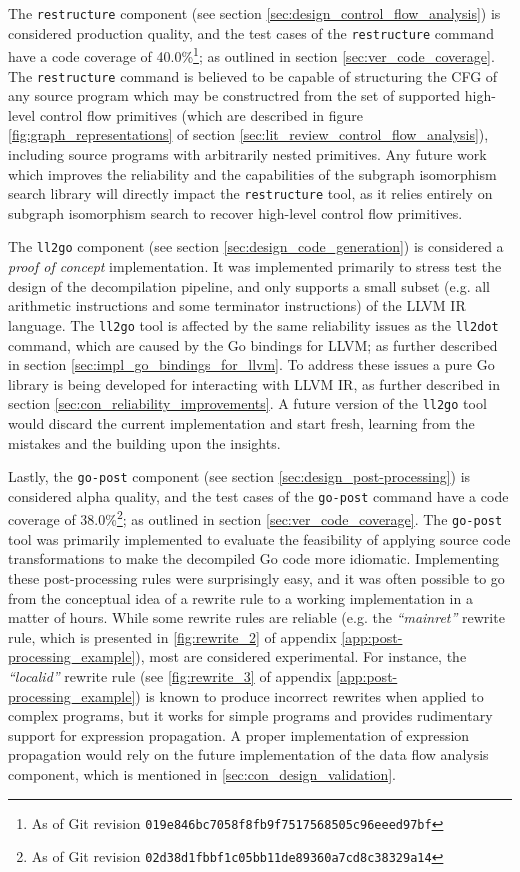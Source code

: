 The \texttt{restructure} component (see section \ref{sec:design_control_flow_analysis}) is considered production quality, and the test cases of the \texttt{restructure} command have a code coverage of 40.0\%\footnote{As of Git revision \texttt{019e846bc7058f8fb9f7517568505c96eeed97bf}}; as outlined in section \ref{sec:ver_code_coverage}. The \texttt{restructure} command is believed to be capable of structuring the CFG of any source program which may be constructred from the set of supported high-level control flow primitives (which are described in figure \ref{fig:graph_representations} of section \ref{sec:lit_review_control_flow_analysis}), including source programs with arbitrarily nested primitives. Any future work which improves the reliability and the capabilities of the subgraph isomorphism search library will directly impact the \texttt{restructure} tool, as it relies entirely on subgraph isomorphism search to recover high-level control flow primitives.

The \texttt{ll2go} component (see section \ref{sec:design_code_generation}) is considered a \textit{proof of concept} implementation. It was implemented primarily to stress test the design of the decompilation pipeline, and only supports a small subset (e.g. all arithmetic instructions and some terminator instructions) of the LLVM IR language. The \texttt{ll2go} tool is affected by the same reliability issues as the \texttt{ll2dot} command, which are caused by the Go bindings for LLVM; as further described in section \ref{sec:impl_go_bindings_for_llvm}. To address these issues a pure Go library is being developed for interacting with LLVM IR, as further described in section \ref{sec:con_reliability_improvements}. A future version of the \texttt{ll2go} tool would discard the current implementation and start fresh, learning from the mistakes and the building upon the insights.

Lastly, the \texttt{go-post} component (see section \ref{sec:design_post-processing}) is considered alpha quality, and the test cases of the \texttt{go-post} command have a code coverage of 38.0\%\footnote{As of Git revision \texttt{02d38d1fbbf1c05bb11de89360a7cd8c38329a14}}; as outlined in section \ref{sec:ver_code_coverage}. The \texttt{go-post} tool was primarily implemented to evaluate the feasibility of applying source code transformations to make the decompiled Go code more idiomatic. Implementing these post-processing rules were surprisingly easy, and it was often possible to go from the conceptual idea of a rewrite rule to a working implementation in a matter of hours. While some rewrite rules are reliable (e.g. the \textit{``mainret''} rewrite rule, which is presented in \ref{fig:rewrite_2} of appendix \ref{app:post-processing_example}), most are considered experimental. For instance, the \textit{``localid''} rewrite rule (see \ref{fig:rewrite_3} of appendix \ref{app:post-processing_example}) is known to produce incorrect rewrites when applied to complex programs, but it works for simple programs and provides rudimentary support for expression propagation. A proper implementation of expression propagation would rely on the future implementation of the data flow analysis component, which is mentioned in \ref{sec:con_design_validation}.





